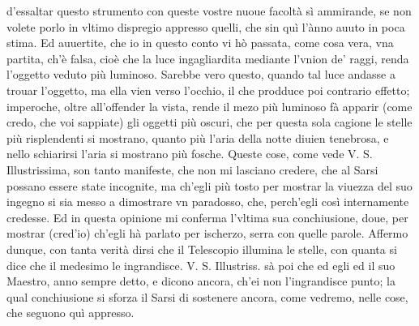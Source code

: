 \documentclass[11pt,twoside,openany]{book}
\begin{document}
d'essaltar questo strumento con queste vostre nuoue facoltà sì ammirande, se non volete porlo in vltimo dispregio appresso quelli, che sin quì l'ànno auuto in poca stima. Ed auuertite, che io in questo conto vi hò passata, come cosa vera, vna partita, ch'è falsa, cioè che la luce ingagliardita mediante l'vnion de' raggi, renda l'oggetto veduto più luminoso. Sarebbe vero questo, quando tal luce andasse a trouar l'oggetto, ma ella vien verso l'occhio, il che prodduce poi contrario effetto; imperoche, oltre all'offender la vista, rende il mezo più luminoso fà apparir (come credo, che voi sappiate) gli oggetti più oscuri, che per questa sola cagione le stelle più risplendenti si mostrano, quanto più l'aria della notte diuien tenebrosa, e nello schiarirsi l'aria si mostrano più fosche. Queste cose, come vede V. S. Illustrissima, son tanto manifeste, che non mi lasciano credere, che al Sarsi possano essere state incognite, ma ch'egli più tosto per mostrar la viuezza del suo ingegno si sia messo a dimostrare vn paradosso, che, perch'egli così internamente credesse. Ed in questa opinione mi conferma l'vltima sua conchiusione, doue, per mostrar (cred'io) ch'egli hà parlato per ischerzo, serra con quelle parole. Affermo dunque, con tanta verità dirsi che il Telescopio illumina le stelle, con quanta si dice che il medesimo le ingrandisce. V. S. Illustriss. sà poi che ed egli ed il suo Maestro, anno sempre detto, e dicono ancora, ch'ei non l'ingrandisce punto; la qual conchiusione si sforza il Sarsi di sostenere ancora, come vedremo, nelle cose, che seguono quì appresso.
\end{document}
